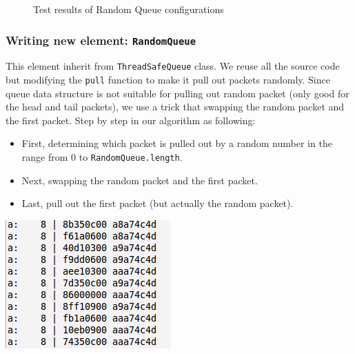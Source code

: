 \documentclass[a4paper]{article}
\begin{document}
    \begin{figure}
      \centering
      \caption{Test results of Random Queue configurations}
      \label{fig:test-clickrandomqueue}
  \end{figure}
  
  \subsubsection{Writing new element: \texttt{RandomQueue}}
  This element inherit from \texttt{ThreadSafeQueue} class. We reuse all the source code but modifying the \texttt{pull} function to make it pull out packets randomly. Since queue data structure is not suitable for pulling out random packet (only good for the head and tail packets), we use a trick that swapping the random packet and the first packet. Step by step in our algorithm as following:
  \begin{itemize}
  	\item First, determining which packet is pulled out by a random number in the range from $0$ to \texttt{RandomQueue.length}.
  	\item Next, swapping the random packet and the first packet.
  	\item Last, pull out the first packet (but actually the random packet).
  \end{itemize}
   \begin{center}
	\includegraphics[scale=0.70]{test-randomqueue.png}
	\label{fig:test-randsource}
  \end{center}
\end{document}
